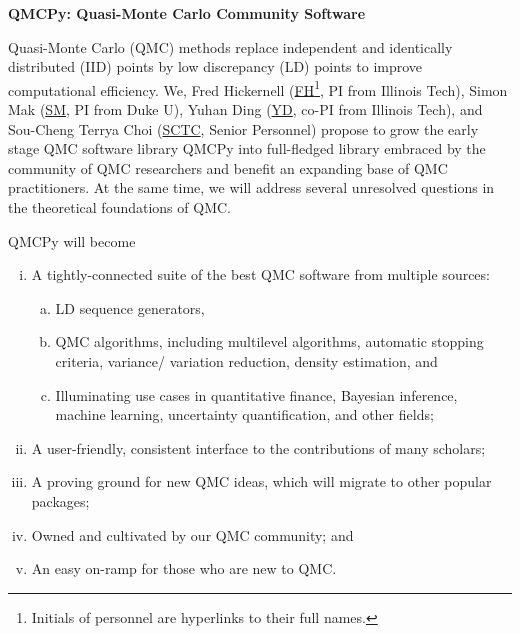 \documentclass[11pt]{NSFamsart}
\newcommand{\FH}{\hyperlink{FHlink}{FH}\xspace}
\newcommand{\SM}{\hyperlink{SMlink}{SM}\xspace}
\newcommand{\SCTC}{\hyperlink{SCTClink}{SCTC}\xspace}
\newcommand{\YD}{\hyperlink{YDlink}{YD}\xspace}
\begin{document}

\begin{center}
\Large \textbf{
QMCPy: Quasi-Monte Carlo Community Software\\
}
\end{center}
\vspace{-2ex}

\setcounter{tocdepth}{1}
\tableofcontents

\vspace{-6ex}


Quasi-Monte Carlo (QMC) methods replace independent and identically distributed (IID) points by low discrepancy (LD) points to improve computational efficiency.  We, \hypertarget{FHlink}{Fred Hickernell} (\FH\footnote{Initials of personnel are hyperlinks to their full names.}, PI from Illinois Tech), \hypertarget{SMlink}{Simon Mak} (\SM, PI from Duke U), \hypertarget{YDlink}{Yuhan Ding} (\YD, co-PI from Illinois Tech), and \hypertarget{SCTClink}{Sou-Cheng Terrya Choi} (\SCTC, Senior Personnel) propose to grow the early stage QMC software library QMCPy \cite{QMCPy2020a} into full-fledged library embraced by the community of QMC researchers and benefit an expanding base of QMC practitioners.  At the same time, we will address several unresolved  questions in the theoretical foundations of QMC.  

QMCPy will become
\begin{enumerate}[i.]
    \item A tightly-connected suite of the best QMC software from multiple sources:
    \begin{enumerate}[a)]
        \item LD sequence generators,
        \item QMC algorithms, including multilevel algorithms, automatic stopping criteria, variance/ variation reduction, density estimation, and
        \item Illuminating use cases in quantitative finance, Bayesian inference, machine learning, uncertainty quantification, and other fields;
    \end{enumerate}
    \item A user-friendly, consistent interface to the contributions of many scholars;
    \item A proving ground for new QMC ideas, which will migrate to other popular packages;
    \item Owned and cultivated by our QMC community; and
    \item An easy on-ramp for those who are new to QMC.
\end{enumerate}
\end{document}
